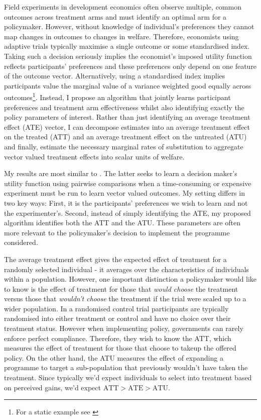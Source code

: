 \documentclass[twoside,11pt]{article}
\begin{document}
Field experiments in development economics often observe multiple, common outcomes 
across treatment arms and must identify an optimal arm for a policymaker. However, 
without knowledge of individual's preferences they cannot map changes in outcomes 
to changes in welfare.
 Therefore, economists using adaptive trials typically maximise a single outcome or 
 some standardised index. Taking such a decision seriously 
implies the economist's imposed utility function reflects participants' preferences 
and these preferences only depend on one feature of the outcome vector. Alternatively, 
using a standardised index implies 
participants value the marginal value of a variance weighted good equally across 
outcomes\footnote{For a static example see \cite{ashraf2010a,blattman2017a,bandiera2017a}}. Instead, I propose an algorithm that jointly learns participant 
preferences and treatment arm effectiveness whilst also identifying exactly the 
policy parameters of interest. Rather than just identifying  an average treatment effect (ATE) vector, 
I can decompose estimates into an average treatment effect on the treated (ATT) and 
an average treatment effect on the untreated (ATU) and finally, estimate the necessary marginal 
rates of substitution to 
aggregate vector valued treatment effects into scalar units of  welfare. 


My results are most similar to \citep{dewancker2016a,lin2022preference}. The latter seeks 
to learn a decision maker's utility function using pairwise comparisons when a 
time-consuming or expensive experiment must be run to learn 
vector valued outcomes. My setting differs in two key ways: First, it is the 
participants' preferences we wish to learn and not the experimenter's. Second, 
instead of simply identifying the ATE, my proposed algorithm identifies both 
the ATT and the ATU. These parameters are often more relevant to the policymaker's 
decision to implement the programme considered.

The average treatment effect gives the expected effect of treatment for 
a randomly selected individual - it averages over the characteristics of 
individuals within a population. However, one important distinction a policymaker 
would like to know is the effect of treatment for those that \textit{would choose} 
the treatment versus those that \textit{wouldn't choose} the treatment if the trial 
were scaled up to a wider population. In a 
randomised control trial participants are typically randomised into either treatment 
or control and have no choice over their treatment status. However when implementing 
policy, governments can rarely enforce perfect compliance. Therefore, they wish to 
know the ATT, which measures the effect of treatment for those that choose to takeup 
the offered policy. On the other hand, the ATU measures the effect of expanding a 
programme to target a sub-population that previously wouldn't have taken the 
treatment. Since typically we'd expect individuals to select into treatment based 
on perceived gains, we'd expect $\text{ATT} > \text{ATE} > \text{ATU}$.  
\end{document}
